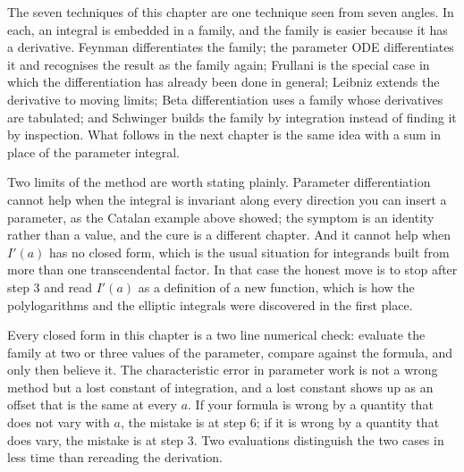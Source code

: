 The seven techniques of this chapter are one technique seen from seven angles. In each, an integral is embedded in a family, and the family is easier because it has a derivative. Feynman differentiates the family; the parameter ODE differentiates it and recognises the result as the family again; Frullani is the special case in which the differentiation has already been done in general; Leibniz extends the derivative to moving limits; Beta differentiation uses a family whose derivatives are tabulated; and Schwinger builds the family by integration instead of finding it by inspection. What follows in the next chapter is the same idea with a sum in place of the parameter integral.

Two limits of the method are worth stating plainly. Parameter differentiation cannot help when the integral is invariant along every direction you can insert a parameter, as the Catalan example above showed; the symptom is an identity rather than a value, and the cure is a different chapter. And it cannot help when $I'(a)$ has no closed form, which is the usual situation for integrands built from more than one transcendental factor. In that case the honest move is to stop after step 3 and read $I'(a)$ as a definition of a new function, which is how the polylogarithms and the elliptic integrals were discovered in the first place.

\begin{keynote}
Every closed form in this chapter is a two line numerical check: evaluate the family at two or three values of the parameter, compare against the formula, and only then believe it. The characteristic error in parameter work is not a wrong method but a lost constant of integration, and a lost constant shows up as an offset that is the same at every $a$. If your formula is wrong by a quantity that does not vary with $a$, the mistake is at step 6; if it is wrong by a quantity that does vary, the mistake is at step 3. Two evaluations distinguish the two cases in less time than rereading the derivation.
\end{keynote}

